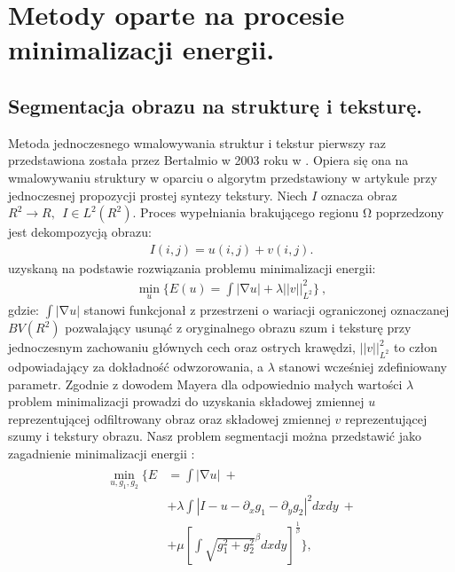 \documentclass[12pt, twoside, openany]{report}
\theoremstyle{definition}
\begin{document}
\chapter{Metody oparte na procesie minimalizacji energii.}
\section{Segmentacja obrazu na strukturę i teksturę.}\label{sec:StructureTextureNavierStokes}
Metoda jednoczesnego wmalowywania struktur i tekstur pierwszy raz przedstawiona została przez Bertalmio w 2003 roku w \cite{NavierStokesAndTexturePropagation}. Opiera się ona na wmalowywaniu struktury w oparciu o algorytm przedstawiony w artykule przy jednoczesnej propozycji prostej syntezy tekstury. Niech $I$ oznacza obraz $R^2\to R,\ \ I\in L^2(R^2)$. Proces wypełniania brakującego regionu $\mathrm{\Omega }$ poprzedzony jest dekompozycją obrazu:
\begin{align}
I\left(i,j\right)=u\left(i,j\right)+v\left(i,j\right).
\label{STRUCTURETEXTURE1}
\end{align}
uzyskaną na podstawie rozwiązania problemu minimalizacji energii:
\begin{align} 
{\mathop{\mathrm{min}}_{u} \Biggl\{E\left(u\right)=\int{\left|\mathrm{\nabla }u\right|+\lambda {\left|\left|v\right|\right|}^2_{L^2}}\Biggr\}\ },
\label{STRUCTURETEXTURE2}
\end{align}
gdzie: $\int{\left|\mathrm{\nabla }u\right|}$ stanowi funkcjonał z przestrzeni o wariacji ograniczonej oznaczanej $BV(R^2)$ pozwalający usunąć z oryginalnego obrazu szum i teksturę przy jednoczesnym zachowaniu głównych cech oraz ostrych krawędzi, ${\left|\left|v\right|\right|}^2_{L^2}$ to człon odpowiadający za dokładność odwzorowania, a $\lambda $ stanowi wcześniej zdefiniowany parametr. Zgodnie z dowodem Mayera \cite{meyer2001oscillating} dla odpowiednio małych wartości $\lambda $ problem minimalizacji prowadzi do uzyskania składowej zmiennej $u$ reprezentującej odfiltrowany obraz oraz składowej zmiennej $v$ reprezentującej szumy i tekstury obrazu. Nasz problem segmentacji można przedstawić jako zagadnienie minimalizacji energii \cite{vese2003modeling}:
\begin{align}
\begin{aligned} 
\mathop{\mathrm{min}}_{u,g_1,g_2} \Biggl\{E &= \int{\left|\mathrm{\nabla }u\right| } \ + \\
&+\lambda \int{\left|I-u-\partial_x g_1- \partial_y g_2 \right|}^2dxdy \ +\\
&+ \mu {\left[\int{{\sqrt{g^2_1+g^2_2}}^\beta dxdy}\right]}^{\frac{1}{\beta}}\Biggr\},
\end{aligned}
\end{align}
\end{document}
